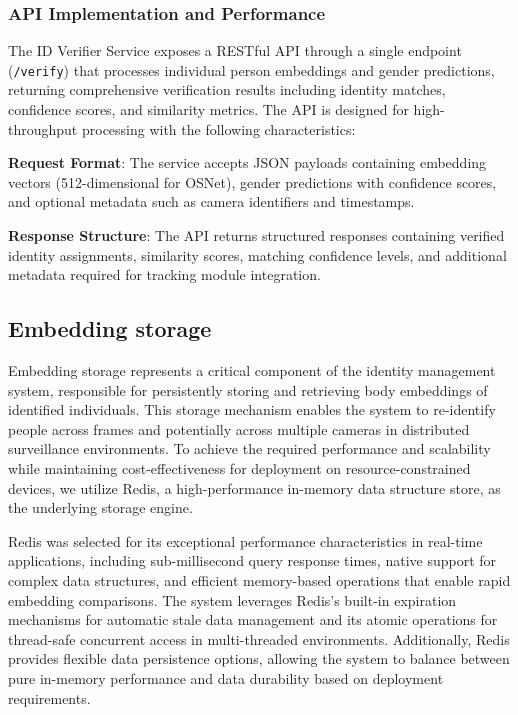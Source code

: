 \subsubsection{API Implementation and Performance}

The ID Verifier Service exposes a RESTful API through a single endpoint (\texttt{/verify}) that processes individual person embeddings and gender predictions, returning comprehensive verification results including identity matches, confidence scores, and similarity metrics. The API is designed for high-throughput processing with the following characteristics:

\textbf{Request Format}: The service accepts JSON payloads containing embedding vectors (512-dimensional for OSNet), gender predictions with confidence scores, and optional metadata such as camera identifiers and timestamps.

\textbf{Response Structure}: The API returns structured responses containing verified identity assignments, similarity scores, matching confidence levels, and additional metadata required for tracking module integration.

\subsection{Embedding storage}

Embedding storage represents a critical component of the identity management system, responsible for persistently storing and retrieving body embeddings of identified individuals. This storage mechanism enables the system to re-identify people across frames and potentially across multiple cameras in distributed surveillance environments. To achieve the required performance and scalability while maintaining cost-effectiveness for deployment on resource-constrained devices, we utilize Redis, a high-performance in-memory data structure store, as the underlying storage engine.

Redis was selected for its exceptional performance characteristics in real-time applications, including sub-millisecond query response times, native support for complex data structures, and efficient memory-based operations that enable rapid embedding comparisons. The system leverages Redis's built-in expiration mechanisms for automatic stale data management and its atomic operations for thread-safe concurrent access in multi-threaded environments. Additionally, Redis provides flexible data persistence options, allowing the system to balance between pure in-memory performance and data durability based on deployment requirements.

